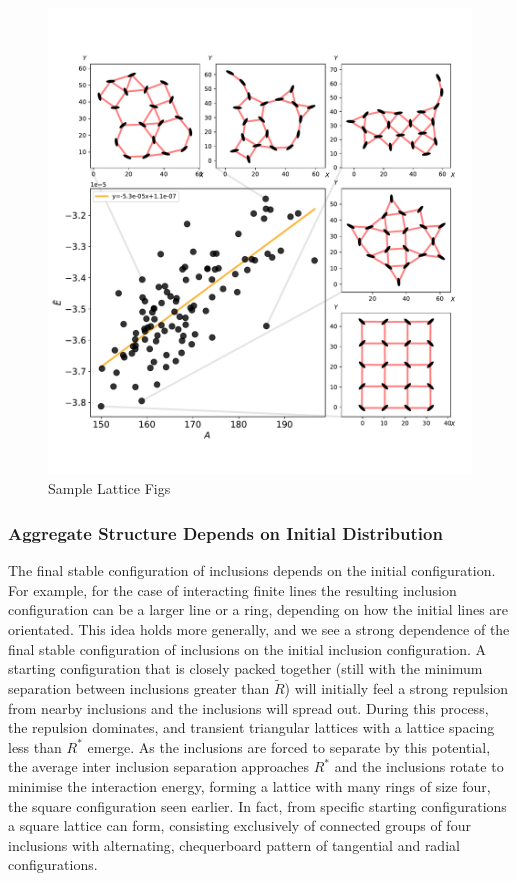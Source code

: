 
\begin{figure}[h]
\centering
\includegraphics[width=12cm]{figures/3-elastic-figs/autoLatticeEgs100slope.pdf}
\caption{Sample Lattice Figs}
\end{figure}

\subsubsection{Aggregate Structure Depends on Initial Distribution}

The final stable configuration of inclusions depends on the initial configuration. For example, for the case of interacting finite lines the resulting inclusion configuration can be a larger line or a ring, depending on how the initial lines are orientated. This idea holds more generally, and we see a strong dependence of the final stable configuration of inclusions on the initial inclusion configuration. A starting configuration that is closely packed together (still with the minimum separation between inclusions greater than $\tilde{R}$) will initially feel a strong repulsion from nearby inclusions and the inclusions will spread out. During this process, the repulsion dominates, and transient triangular lattices with a lattice spacing less than $R^*$ emerge. As the inclusions are forced to separate by this potential, the average inter inclusion separation approaches $R^*$ and the inclusions rotate to minimise the interaction energy, forming a lattice with many rings of size four, the square configuration seen earlier. In fact, from specific starting configurations a square lattice can form, consisting exclusively of connected groups of four inclusions with alternating, chequerboard pattern of tangential and radial configurations.

